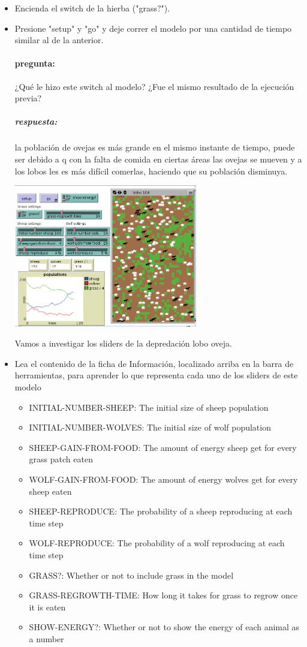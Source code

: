 \documentclass[12pt,letterpaper]{article}
\begin{document}
\begin{itemize}
	\item Encienda el switch de  la hierba ("grass?").
	\item Presione "setup" y "go" y deje correr el modelo por una cantidad de tiempo similar al de la anterior.
	
		\paragraph{pregunta: }
			¿Qué le hizo este switch al modelo? ¿Fue el mismo resultado de la ejecución previa?

		\subparagraph{respuesta:}		
			la población de ovejas es más grande en el mismo instante de tiempo, puede ser debido a q con la falta de comida en ciertas áreas las ovejas se mueven y a los lobos les es más difícil comerlas, haciendo que su población disminuya.

			\begin{center}
				\includegraphics[width=8cm]{./imagenes/image6.png}
			\end{center}
	
	Vamos a investigar los sliders de la depredación lobo oveja.
	\item Lea el contenido de la ficha de Información, localizado arriba en la barra de herramientas, para aprender lo que representa cada uno de los sliders de este modelo
	
		\begin{itemize}	
			\item INITIAL-NUMBER-SHEEP: The initial size of sheep population
			\item INITIAL-NUMBER-WOLVES: The initial size of wolf population
			\item SHEEP-GAIN-FROM-FOOD: The amount of energy sheep get for every grass patch eaten
			\item WOLF-GAIN-FROM-FOOD: The amount of energy wolves get for every sheep eaten
			\item SHEEP-REPRODUCE: The probability of a sheep reproducing at each time step
			\item WOLF-REPRODUCE: The probability of a wolf reproducing at each time step
			\item GRASS?: Whether or not to include grass in the model
			\item GRASS-REGROWTH-TIME: How long it takes for grass to regrow once it is eaten
			\item SHOW-ENERGY?: Whether or not to show the energy of each animal as a number
		\end{itemize}
		

\end{itemize}
\end{document}

